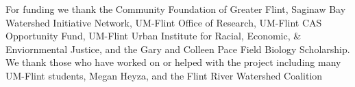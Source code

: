 \documentclass[b0paper,margin=1cm,landscape]{baposter}
\begin{document}
\begin{poster}
{  For funding we thank the Community Foundation of Greater Flint, 
  Saginaw Bay Watershed Initiative Network, 
  UM-Flint Office of Research, 
  UM-Flint CAS Opportunity Fund, 
  UM-Flint Urban Institute for Racial, Economic, \& Enviornmental Justice,
  and the Gary and Colleen Pace Field Biology Scholarship. 
  We thank those who have worked on or helped with the project including many UM-Flint students, 
  Megan Heyza, and the Flint River Watershed Coalition

}
\end{poster}
\end{document}
